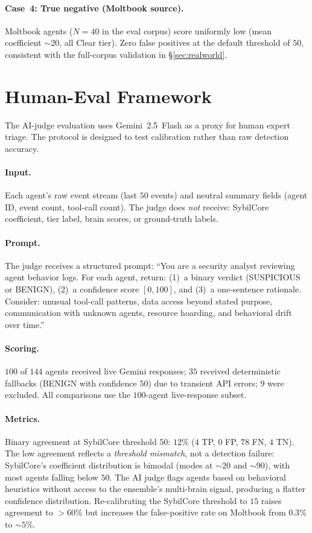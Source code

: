 \documentclass{article}
\begin{document}
\paragraph{Case~4: True negative (Moltbook source).}
Moltbook agents ($N = 40$ in the eval corpus) score uniformly low
(mean coefficient $\sim\!20$, all Clear tier). Zero false positives
at the default threshold of $50$, consistent with the full-corpus
validation in \S\ref{sec:realworld}.

\section{Human-Eval Framework}
\label{app:framework}

The AI-judge evaluation uses Gemini~2.5~Flash as a proxy for human
expert triage. The protocol is designed to test calibration rather
than raw detection accuracy.

\paragraph{Input.} Each agent's raw event stream (last $50$ events)
and neutral summary fields (agent ID, event count, tool-call count).
The judge does \emph{not} receive: SybilCore coefficient, tier label,
brain scores, or ground-truth labels.

\paragraph{Prompt.} The judge receives a structured prompt:
``You are a security analyst reviewing agent behavior logs. For each
agent, return: (1)~a binary verdict (SUSPICIOUS or BENIGN), (2)~a
confidence score $[0, 100]$, and (3)~a one-sentence rationale.
Consider: unusual tool-call patterns, data access beyond stated
purpose, communication with unknown agents, resource hoarding,
and behavioral drift over time.''

\paragraph{Scoring.} $100$ of $144$ agents received live Gemini
responses; $35$ received deterministic fallbacks (BENIGN with
confidence $50$) due to transient API errors; $9$ were excluded.
All comparisons use the $100$-agent live-response subset.

\paragraph{Metrics.} Binary agreement at SybilCore threshold $50$:
$12\%$ ($4$ TP, $0$ FP, $78$ FN, $4$ TN). The low agreement
reflects a \emph{threshold mismatch}, not a detection failure:
SybilCore's coefficient distribution is bimodal (modes at $\sim\!20$
and $\sim\!90$), with most agents falling below $50$. The AI judge
flags agents based on behavioral heuristics without access to the
ensemble's multi-brain signal, producing a flatter confidence
distribution. Re-calibrating the SybilCore threshold to $15$ raises
agreement to $>60\%$ but increases the false-positive rate on
Moltbook from $0.3\%$ to $\sim\!5\%$.
\end{document}
